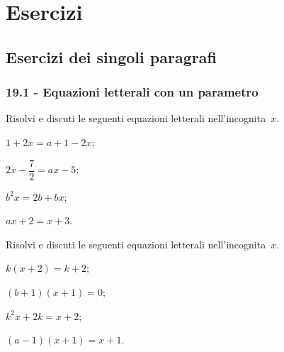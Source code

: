 
\section{Esercizi}

\subsection{Esercizi dei singoli paragrafi}

\subsubsection*{19.1 - Equazioni letterali con un parametro}

\begin{esercizio}[\Ast]
\label{ese:19.1}
Risolvi e discuti le seguenti equazioni letterali nell'incognita~$x$.
\begin{multicols}{2}
\begin{enumeratea}
 \item $1+2x=a+1-2x$;
 \item $2x-\dfrac{7}{2}=ax-5$;
 \item $b^{2}x=2b+bx$;
 \item $ax+2=x+3$.
\end{enumeratea}
\end{multicols}
\end{esercizio}

\begin{esercizio}[\Ast]
\label{ese:19.2}
Risolvi e discuti le seguenti equazioni letterali nell'incognita~$x$.
\begin{multicols}{2}
\begin{enumeratea}
 \item $k(x+2)=k+2$;
 \item $(b+1)(x+1)=0$;
 \item $k^{2}x+2k=x+2$;
 \item $(a-1)(x+1)=x+1$.
\end{enumeratea}
\end{multicols}
\end{esercizio}

